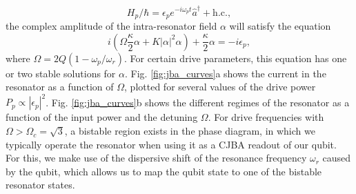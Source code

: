 %
\begin{equation}
H_p/\hbar = \epsilon_p e^{-i\omega_p t}\hat{a}^\dagger+\mathrm{h.c.},
\end{equation}
%
the complex amplitude of the intra-resonator field $\alpha$ will satisfy the equation 
%
\begin{equation}
i\left(\Omega\frac{\kappa}{2}\alpha+K|\alpha|^2\alpha\right)+\frac{\kappa}{2}\alpha = -i\epsilon_p,
\end{equation}
%
where $\Omega = 2Q\left(1-\omega_p/\omega_r\right)$. For certain drive parameters, this equation has one or two stable solutions for $\alpha$. Fig. \ref{fig:jba_curves}a shows the current in the resonator as a function of $\Omega$, plotted for several values of the drive power $P_p\propto |\epsilon_p|^2$. Fig. \ref{fig:jba_curves}b shows the different regimes of the resonator as a function of the input power and the detuning $\Omega$.  For drive frequencies with $\Omega > \Omega_c = \sqrt{3}$, a bistable region exists in the phase diagram, in which we typically operate the resonator when using it as a CJBA readout of our qubit. For this, we make use of the dispersive shift of the resonance frequency $\omega_r$ caused by the qubit, which allows us to map the qubit state to one of the bistable resonator states.

%
%
 
